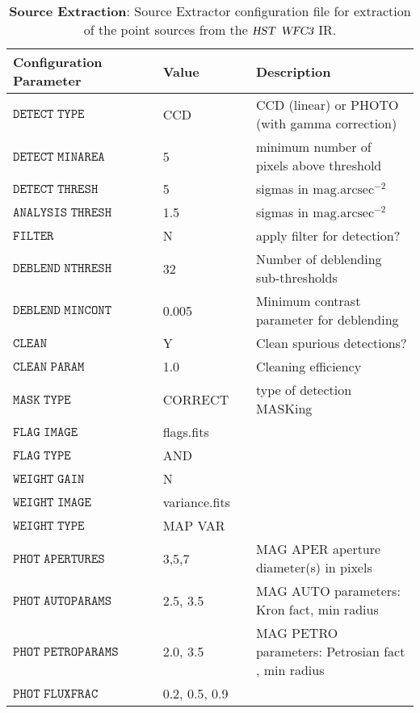 \documentclass[onecolumn]{aastex61}
\newcommand{\project}[1]{{\textsl{#1}}}
\newcommand{\hst}{\project{HST}}
\newcommand{\wfc}{\project{WFC3}}
\begin{document}
\begin{table}
\begin{center}
  \label{tab:sextractor}
  \caption{{\bf Source Extraction}: Source Extractor configuration file for extraction of the point sources from the $\hst$ $\wfc$ IR.}
\begin{tabular}{@{}lllll}
\\ \hline 
    Configuration Parameter & & Value & &  Description\\ \hline
  $\mathtt{DETECT \; TYPE}$ & & CCD & &  CCD (linear) or PHOTO (with gamma correction) \\
  $\mathtt{DETECT \; MINAREA}$ & & 5 & &  minimum number of pixels above threshold \\
  $\mathtt{DETECT \; THRESH}$ & & 5 & &  sigmas in $\mathrm{mag.arcsec}^{-2}$ \\
  $\mathtt{ANALYSIS \; THRESH}$ & & 1.5 & & sigmas in $\mathrm{mag.arcsec}^{-2}$  \\
  $\mathtt{FILTER}$ & & N & &  apply filter for detection?\\ 
  $\mathtt{DEBLEND \;  NTHRESH}$ & & 32 & &  Number of deblending sub-thresholds \\
  $\mathtt{DEBLEND \; MINCONT}$ & & 0.005 & &  Minimum contrast parameter for deblending \\
  $\mathtt{CLEAN}$ & & Y & &  Clean spurious detections?\\
  $\mathtt{CLEAN \; PARAM}$ & & 1.0 & & Cleaning efficiency \\
  $\mathtt{MASK \; TYPE}$ & & CORRECT & &  type of detection MASKing \\
  $\mathtt{FLAG \; IMAGE}$ & & flags.fits & &   \\
  $\mathtt{FLAG \; TYPE}$ & & AND & &   \\
  $\mathtt{WEIGHT \; GAIN}$ & & N & &   \\
  $\mathtt{WEIGHT \; IMAGE}$ & & variance.fits & &  \\
  $\mathtt{WEIGHT \; TYPE}$ & & MAP VAR & &  \\
  $\mathtt{PHOT \; APERTURES}$ & & 3,5,7 & &  MAG APER aperture diameter(s) in pixels \\
  $\mathtt{PHOT \; AUTOPARAMS}$ & & 2.5, 3.5 & &  MAG AUTO parameters: Kron fact, min radius \\
  $\mathtt{PHOT \; PETROPARAMS}$ & & 2.0, 3.5 & &  MAG PETRO parameters: Petrosian fact , min radius \\
  $\mathtt{PHOT \; FLUXFRAC}$ & & 0.2, 0.5, 0.9 & &   \\

\end{tabular}
\end{center}
\end{table}
\end{document}
